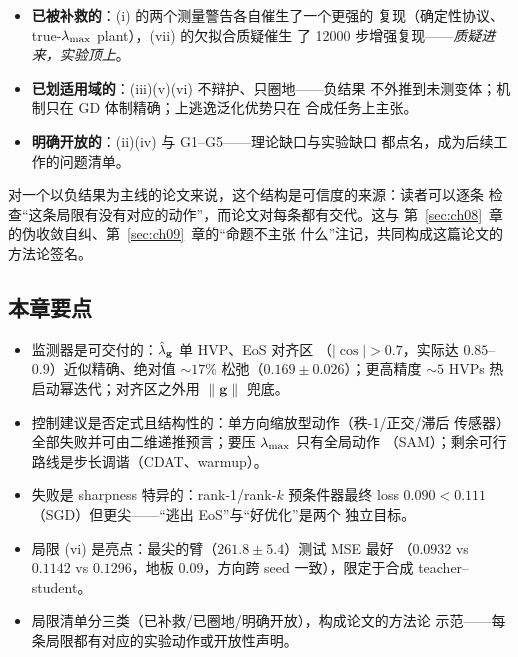 \begin{itemize}
  \item \textbf{已被补救的}：(i) 的两个测量警告各自催生了一个更强的
        复现（确定性协议、true-$\lambda_{\max}$ plant），(vii) 的欠拟合质疑催生
        了 12000 步增强复现——\emph{质疑进来，实验顶上}。
  \item \textbf{已划适用域的}：(iii)(v)(vi) 不辩护、只圈地——负结果
        不外推到未测变体；机制只在 GD 体制精确；上逃逸泛化优势只在
        合成任务上主张。
  \item \textbf{明确开放的}：(ii)(iv) 与 G1--G5——理论缺口与实验缺口
        都点名，成为后续工作的问题清单。
\end{itemize}

对一个以负结果为主线的论文来说，这个结构是可信度的来源：读者可以逐条
检查“这条局限有没有对应的动作”，而论文对每条都有交代。这与
第~\ref{sec:ch08}~章的伪收敛自纠、第~\ref{sec:ch09}~章的“命题不主张
什么”注记，共同构成这篇论文的方法论签名。

\subsection*{本章要点}
\begin{itemize}
  \item 监测器是可交付的：$\hat{\lambda}_{\mathbf{g}}$ 单 HVP、EoS 对齐区
        （$|\cos|>0.7$，实际达 $0.85$--$0.9$）近似精确、绝对值
        ${\sim}17\%$ 松弛（$0.169\pm0.026$）；更高精度 ${\sim}5$ HVPs
        热启动幂迭代；对齐区之外用 $\|\mathbf{g}\|$ 兜底。
  \item 控制建议是否定式且结构性的：单方向缩放型动作（秩-1/正交/滞后
        传感器）全部失败并可由二维递推预言；要压 $\lambda_{\max}$ 只有全局动作
        （SAM）；剩余可行路线是步长调谐（CDAT、warmup）。
  \item 失败是 sharpness 特异的：rank-1/rank-$k$ 预条件器最终 loss
        $0.090<0.111$（SGD）但更尖——“逃出 EoS”与“好优化”是两个
        独立目标。
  \item 局限 (vi) 是亮点：最尖的臂（$261.8\pm5.4$）测试 MSE 最好
        （$0.0932$ vs $0.1142$ vs $0.1296$，地板 $0.09$，方向跨 seed
        一致），限定于合成 teacher--student。
  \item 局限清单分三类（已补救/已圈地/明确开放），构成论文的方法论
        示范——每条局限都有对应的实验动作或开放性声明。
\end{itemize}
